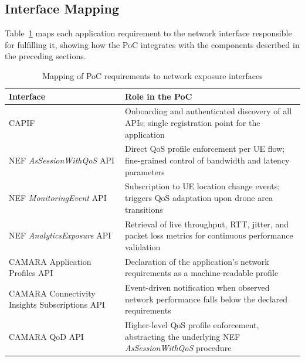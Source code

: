 \subsection{Interface Mapping}

Table~\ref{tab:poc:api:mapping} maps each application requirement to the network interface responsible for fulfilling it, showing how the \acs{PoC} integrates with the components described in the preceding sections.

\begin{table}[ht]
\centering
\small
\renewcommand{\arraystretch}{1.3}
\begin{tabular}{p{4.5cm} p{9cm}}
\toprule
\textbf{Interface} & \textbf{Role in the PoC} \\
\midrule
\acs{CAPIF} & Onboarding and authenticated discovery of all \acsp{API}; single registration point for the application \\
\acs{NEF} \textit{AsSessionWithQoS} \acs{API} & Direct \acs{QoS} profile enforcement per \acs{UE} flow; fine-grained control of bandwidth and latency parameters \\
\acs{NEF} \textit{MonitoringEvent} \acs{API} & Subscription to \acs{UE} location change events; triggers \acs{QoS} adaptation upon drone area transitions \\
\acs{NEF} \textit{AnalyticsExposure} \acs{API} & Retrieval of live throughput, \acs{RTT}, jitter, and packet loss metrics for continuous performance validation \\
CAMARA Application Profiles \acs{API} & Declaration of the application's network requirements as a machine-readable profile \\
CAMARA Connectivity Insights Subscriptions \acs{API} & Event-driven notification when observed network performance falls below the declared requirements \\
CAMARA \acs{QoD} \acs{API} & Higher-level \acs{QoS} profile enforcement, abstracting the underlying \acs{NEF} \textit{AsSessionWithQoS} procedure \\
\bottomrule
\end{tabular}
\caption{Mapping of PoC requirements to network exposure interfaces}
\label{tab:poc:api:mapping}
\end{table}

